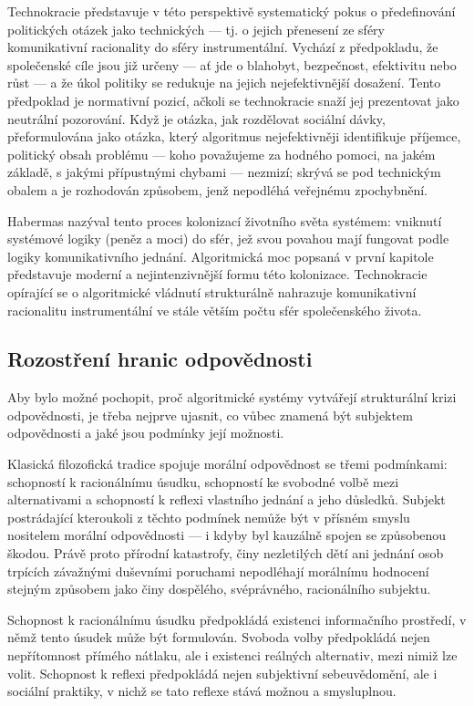 Technokracie představuje v této perspektivě systematický pokus o předefinování politických otázek jako technických — tj. o jejich přenesení ze sféry komunikativní racionality do sféry instrumentální. Vychází z předpokladu, že společenské cíle jsou již určeny — ať jde o blahobyt, bezpečnost, efektivitu nebo růst — a že úkol politiky se redukuje na jejich nejefektivnější dosažení. Tento předpoklad je normativní pozicí, ačkoli se technokracie snaží jej prezentovat jako neutrální pozorování. Když je otázka, jak rozdělovat sociální dávky, přeformulována jako otázka, který algoritmus nejefektivněji identifikuje  příjemce, politický obsah problému — koho považujeme za hodného pomoci, na jakém základě, s jakými přípustnými chybami — nezmizí; skrývá se pod technickým obalem a je rozhodován způsobem, jenž nepodléhá veřejnému zpochybnění.

Habermas nazýval tento proces kolonizací životního světa systémem: vniknutí systémové logiky (peněz a moci) do sfér, jež svou povahou mají fungovat podle logiky komunikativního jednání. Algoritmická moc popsaná v první kapitole představuje moderní a nejintenzivnější formu této kolonizace. Technokracie opírající se o algoritmické vládnutí strukturálně nahrazuje komunikativní racionalitu instrumentální ve stále větším počtu sfér společenského života.

\subsection{Rozostření hranic odpovědnosti}
Aby bylo možné pochopit, proč algoritmické systémy vytvářejí strukturální krizi odpovědnosti, je třeba nejprve ujasnit, co vůbec znamená být subjektem odpovědnosti a jaké jsou podmínky její možnosti.

Klasická filozofická tradice spojuje morální odpovědnost se třemi podmínkami: schopností k racionálnímu úsudku, schopností ke svobodné volbě mezi alternativami a schopností k reflexi vlastního jednání a jeho důsledků. Subjekt postrádající kteroukoli z těchto podmínek nemůže být v přísném smyslu nositelem morální odpovědnosti — i kdyby byl kauzálně spojen se způsobenou škodou. Právě proto přírodní katastrofy, činy nezletilých dětí ani jednání osob trpících závažnými duševními poruchami nepodléhají morálnímu hodnocení stejným způsobem jako činy dospělého, svéprávného, racionálního subjektu.

Schopnost k racionálnímu úsudku předpokládá existenci informačního prostředí, v němž tento úsudek může být formulován. Svoboda volby předpokládá nejen nepřítomnost přímého nátlaku, ale i existenci reálných alternativ, mezi nimiž lze volit. Schopnost k reflexi předpokládá nejen subjektivní sebeuvědomění, ale i sociální praktiky, v nichž se tato reflexe stává možnou a smysluplnou.

